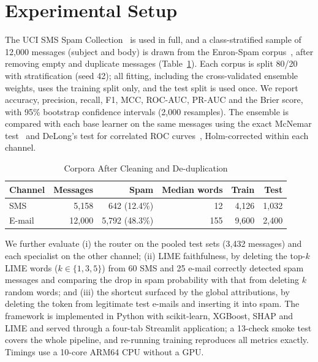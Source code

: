 \documentclass[conference]{IEEEtran}
\begin{document}
\section{Experimental Setup}\label{sec:setup}

The UCI SMS Spam Collection~\cite{almeida2011sms} is used in full, and a
class-stratified sample of 12,000 messages (subject and body) is drawn from the
Enron-Spam corpus~\cite{metsis2006spam}, after removing empty and duplicate
messages (Table~\ref{tab:data}). Each corpus is split 80/20 with
stratification (seed 42); all fitting, including the cross-validated ensemble
weights, uses the training split only, and the test split is used once. We
report accuracy, precision, recall, F1, MCC, ROC-AUC, PR-AUC and the Brier
score, with 95\% bootstrap confidence intervals (2,000 resamples). The
ensemble is compared with each base learner on the same messages using the
exact McNemar test~\cite{mcnemar1947note} and DeLong's test for correlated ROC
curves~\cite{delong1988comparing}, Holm-corrected within each channel.

\begin{table}[!t]
\caption{Corpora After Cleaning and De-duplication}
\label{tab:data}
\centering
\footnotesize
\setlength{\tabcolsep}{4pt}
\begin{tabular}{@{}lrrrrr@{}}
\toprule
\textbf{Channel} & \textbf{Messages} & \textbf{Spam} & \textbf{Median words} & \textbf{Train} & \textbf{Test} \\
\midrule
SMS~\cite{almeida2011sms} & 5,158 & 642 (12.4\%) & 12 & 4,126 & 1,032 \\
E-mail~\cite{metsis2006spam} & 12,000 & 5,792 (48.3\%) & 155 & 9,600 & 2,400 \\
\bottomrule
\end{tabular}
\end{table}

We further evaluate (i) the router on the pooled test sets (3,432 messages)
and each specialist on the other channel; (ii) LIME faithfulness, by deleting
the top-$k$ LIME words ($k\in\{1,3,5\}$) from 60 SMS and 25 e-mail correctly
detected spam messages and comparing the drop in spam probability with that
from deleting $k$ random words; and (iii) the shortcut surfaced by the global
attributions, by deleting the token from legitimate test e-mails and
inserting it into spam. The framework is implemented in Python with
scikit-learn, XGBoost, SHAP and LIME and served through a four-tab Streamlit
application; a 13-check smoke test covers the whole pipeline, and re-running
training reproduces all metrics exactly. Timings use a 10-core ARM64 CPU
without a GPU.
\end{document}
